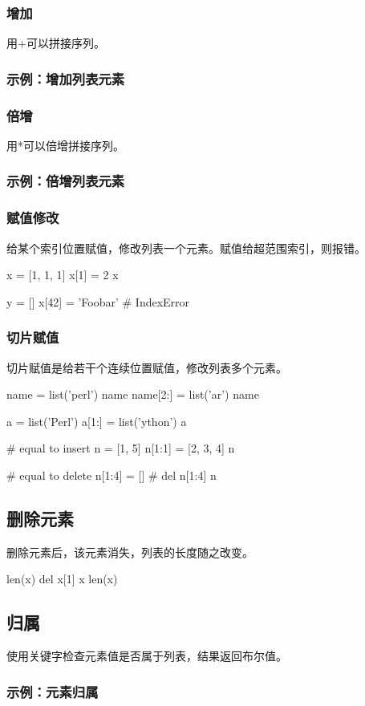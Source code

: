 \subsubsection{增加}
用+可以拼接序列。
\subsubsection{示例：增加列表元素}
\subsubsection{倍增}
用*可以倍增拼接序列。
\subsubsection{示例：倍增列表元素}
\subsubsection{赋值修改}
给某个索引位置赋值，修改列表一个元素。赋值给超范围索引，则报错。
\begin{python}
x = [1, 1, 1]
x[1] = 2
x

y = []
x[42] = 'Foobar'  #  IndexError
\end{python}
\subsubsection{切片赋值}
切片赋值是给若干个连续位置赋值，修改列表多个元素。
\begin{python}
name = list('perl')
name
name[2:] = list('ar')
name

a = list('Perl')
a[1:] = list('ython')
a

# equal to insert 
n = [1, 5]
n[1:1] = [2, 3, 4]
n

# equal to delete
n[1:4] = [] # del n[1:4]
n
\end{python}
\subsection{删除元素}
删除元素后，该元素消失，列表的长度随之改变。
\begin{python}
len(x)
del x[1]
x
len(x)
\end{python}
\subsection{归属}
使用关键字检查元素值是否属于列表，结果返回布尔值。
\subsubsection{示例：元素归属}
